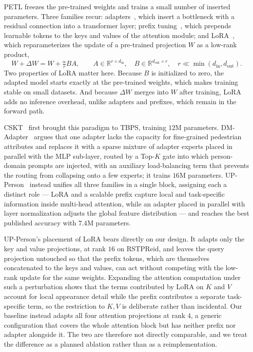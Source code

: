 PETL freezes the pre-trained weights and trains a small number of inserted parameters. Three families recur: adapters~\citep{houlsby2019parameterefficienttransferlearningnlp}, which insert a bottleneck with a residual connection into a transformer layer; prefix tuning~\citep{li2021prefixtuningoptimizingcontinuousprompts}, which prepends learnable tokens to the keys and values of the attention module; and LoRA~\citep{hu2021loralowrankadaptationlarge}, which reparameterizes the update of a pre-trained projection $W$ as a low-rank product,
\begin{equation}\label{eq:lora}
W+\Delta W = W + \tfrac{\alpha}{r}BA,\qquad A\in\mathbb{R}^{r\times d_{\mathrm{in}}},\quad B\in\mathbb{R}^{d_{\mathrm{out}}\times r},\quad r\ll\min(d_{\mathrm{in}},d_{\mathrm{out}}).
\end{equation}
Two properties of LoRA matter here. Because $B$ is initialized to zero, the adapted model starts exactly at the pre-trained weights, which makes training stable on small datasets. And because $\Delta W$ merges into $W$ after training, LoRA adds no inference overhead, unlike adapters and prefixes, which remain in the forward path.

CSKT~\citep{liu2024clipbasedsynergisticknowledgetransfer} first brought this paradigm to TBPS, training $12$M parameters. DM-Adapter~\citep{liu2025dmadapterdomainawaremixtureofadapterstextbased} argues that one adapter lacks the capacity for fine-grained pedestrian attributes and replaces it with a sparse mixture of adapter experts placed in parallel with the MLP sub-layer, routed by a Top-$K$ gate into which person-domain prompts are injected, with an auxiliary load-balancing term that prevents the routing from collapsing onto a few experts; it trains $16$M parameters. UP-Person~\citep{liu2025uppersonunifiedparameterefficienttransfer} instead unifies all three families in a single block, assigning each a distinct role --- LoRA and a scalable prefix capture local and task-specific information inside multi-head attention, while an adapter placed in parallel with layer normalization adjusts the global feature distribution --- and reaches the best published accuracy with $7.4$M parameters.

UP-Person's placement of LoRA bears directly on our design. It adapts only the key and value projections, at rank $16$ on RSTPReid, and leaves the query projection untouched so that the prefix tokens, which are themselves concatenated to the keys and values, can act without competing with the low-rank update for the same weights. Expanding the attention computation under such a perturbation shows that the terms contributed by LoRA on $K$ and $V$ account for local appearance detail while the prefix contributes a separate task-specific term, so the restriction to $K,V$ is deliberate rather than incidental. Our baseline instead adapts all four attention projections at rank $4$, a generic configuration that covers the whole attention block but has neither prefix nor adapter alongside it. The two are therefore not directly comparable, and we treat the difference as a planned ablation rather than as a reimplementation.

